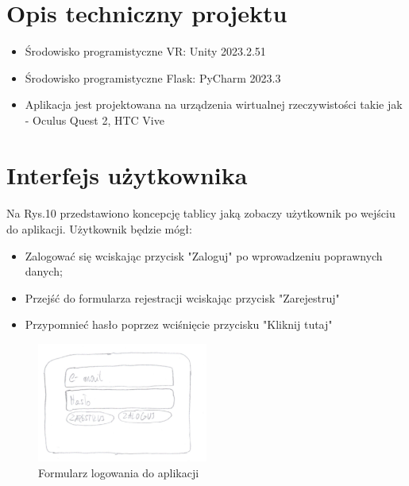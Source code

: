 \documentclass[12pt, letterpaper]{article}
\begin{document}
\section{Opis techniczny projektu}
		
		\begin{itemize}
				\item Środowisko programistyczne VR: Unity 2023.2.51
				\item Środowisko programistyczne Flask: PyCharm 2023.3
				\item Aplikacja jest projektowana na urządzenia wirtualnej rzeczywistości takie jak - Oculus Quest 2, HTC Vive
		\end{itemize}
			
\newpage
\section{Interfejs użytkownika}
		
\paragraph{}
Na Rys.10 przedstawiono koncepcję tablicy jaką zobaczy użytkownik po wejściu do aplikacji. Użytkownik będzie mógł:
		\begin{itemize}
				\item Zalogować się wciskając przycisk "Zaloguj" po wprowadzeniu poprawnych danych;
				\item Przejść do formularza rejestracji wciskając przycisk "Zarejestruj"
				\item Przypomnieć hasło poprzez wciśnięcie przycisku "Kliknij tutaj"
		\end{itemize}
		
\begin{figure}[h]
  \centering
      \includegraphics[width=0.5\textwidth]{GUI_logowanie}
  \caption{Formularz logowania do aplikacji}
\end{figure}
\end{document}

